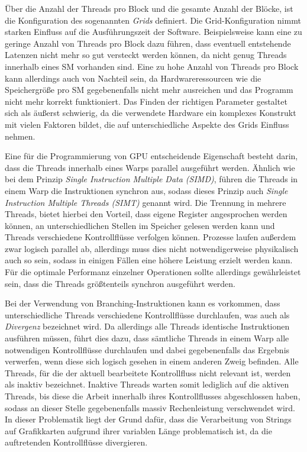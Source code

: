 Über die Anzahl der Threads pro Block und die gesamte Anzahl der Blöcke, ist die Konfiguration des sogenannten \emph{Grids} definiert.
Die Grid-Konfiguration nimmt starken Einfluss auf die Ausführungszeit der Software.
Beispielsweise kann eine zu geringe Anzahl von Threads pro Block dazu führen, dass eventuell entstehende Latenzen nicht mehr so gut versteckt werden können, da nicht genug Threads innerhalb eines SM vorhanden sind.
Eine zu hohe Anzahl von Threads pro Block kann allerdings auch von Nachteil sein, da Hardwareressourcen wie die Speichergröße pro SM gegebenenfalls nicht mehr ausreichen und das Programm nicht mehr korrekt funktioniert.
Das Finden der richtigen Parameter gestaltet sich als äußerst schwierig, da die verwendete Hardware ein komplexes Konstrukt mit vielen Faktoren bildet, die auf unterschiedliche Aspekte des Grids Einfluss nehmen.

Eine für die Programmierung von GPU entscheidende Eigenschaft besteht darin, dass die Threads innerhalb eines Warps parallel ausgeführt werden.
Ähnlich wie bei dem Prinzip \emph{Single Instruction Multiple Data (SIMD)}, führen die Threads in einem Warp die Instruktionen synchron aus, sodass dieses Prinzip auch \emph{Single Instruction Multiple Threads (SIMT)} genannt wird.
Die Trennung in mehrere Threads, bietet hierbei den Vorteil, dass eigene Register angesprochen werden können, an unterschiedlichen Stellen im Speicher gelesen werden kann und Threads verschiedene Kontrollflüsse verfolgen können.
Prozesse laufen außerdem zwar logisch parallel ab, allerdings muss dies nicht notwendigerweise physikalisch auch so sein, sodass in einigen Fällen eine höhere Leistung erzielt werden kann.
Für die optimale Performanz einzelner Operationen sollte allerdings gewährleistet sein, dass die Threads größtenteils synchron ausgeführt werden.

Bei der Verwendung von Branching-Instruktionen kann es vorkommen, dass unterschiedliche Threads verschiedene Kontrollflüsse durchlaufen, was auch als \emph{Divergenz} bezeichnet wird.
Da allerdings alle Threads identische Instruktionen ausführen müssen, führt dies dazu, dass sämtliche Threads in einem Warp alle notwendigen Kontrollflüsse durchlaufen und dabei gegebenenfalls das Ergebnis verwerfen, wenn diese sich logisch gesehen in einem anderen Zweig befinden.
Alle Threads, für die der aktuell bearbeitete Kontrollfluss nicht relevant ist, werden als inaktiv bezeichnet.
Inaktive Threads warten somit lediglich auf die aktiven Threads, bis diese die Arbeit innerhalb ihres Kontrollflusses abgeschlossen haben, sodass an dieser Stelle gegebenenfalls massiv Rechenleistung verschwendet wird.
In dieser Problematik liegt der Grund dafür, dass die Verarbeitung von Strings auf Grafikkarten aufgrund ihrer variablen Länge problematisch ist, da die auftretenden Kontrollflüsse divergieren.

